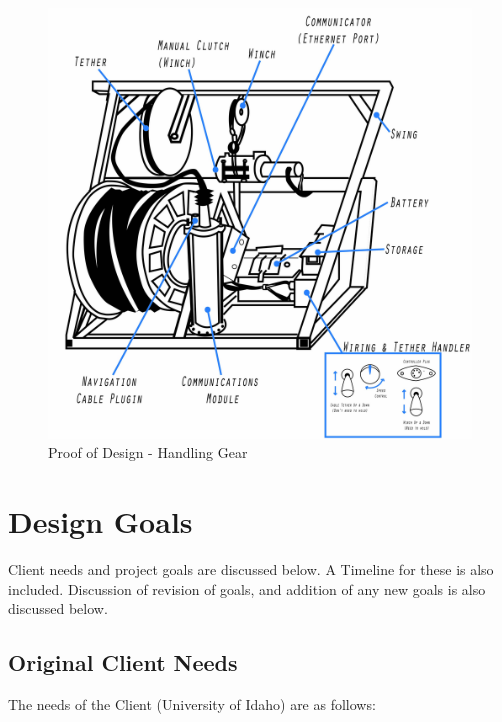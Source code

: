 \documentclass[12pt]{article}
\begin{document}
		\begin{figure}[!htb]
			\centering
			\includegraphics[width = 115mm]{assets/handling_gear.jpg}
			\caption{Proof of Design - Handling Gear \label{overflow}}
		\end{figure}
		
		\clearpage

	\newpage
		
	\section{Design Goals}
	Client needs and project goals are discussed below. A Timeline for these is also included. Discussion of revision of goals, and addition of any new goals is also discussed below.
	
		\subsection{Original Client Needs}
		The needs of the Client (University of Idaho) are as follows:
		
\end{document}
